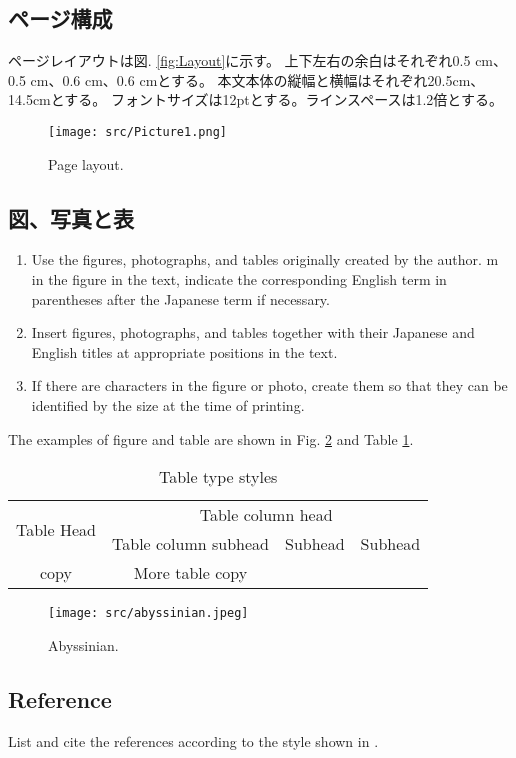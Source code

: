 \subsection{ページ構成}
ページレイアウトは図. \ref{fig:Layout}に示す。
上下左右の余白はそれぞれ0.5 cm、0.5 cm、0.6 cm、0.6 cmとする。
本文本体の縦幅と横幅はそれぞれ20.5cm、14.5cmとする。
フォントサイズは12ptとする。ラインスペースは1.2倍とする。

\begin{figure}[t]
    \centering
    \texttt{[image: src/Picture1.png]}
    \caption{Page layout.}
    \label{fig:layout}
\end{figure}

\subsection{図、写真と表}

\begin{enumerate}
    \item Use the figures, photographs, and tables originally created by the author. m in the figure in the text, indicate the corresponding English term in parentheses after the Japanese term if necessary.
    \item Insert figures, photographs, and tables together with their Japanese and English titles at appropriate positions in the text.
    \item If there are characters in the figure or photo, create them so that they can be identified by the size at the time of printing.
\end{enumerate}

The examples of figure and table are shown in Fig. \ref{fig:abyssinian} and Table \ref{tab:table}.

\begin{table}[t]
    \centering
    \caption{Table type styles}
    \begin{tabular}{c|c|c|c} \hline
        \multirow{2}{1cm}{Table Head} & \multicolumn{3}{|c}{Table column head} \\ \cline{2-4}
         & Table column subhead & Subhead & Subhead \\ \hline\hline
        copy & More table copy & & \\ \hline
    \end{tabular}
    \label{tab:table}
\end{table}

\begin{figure}[t]
    \centering
    \texttt{[image: src/abyssinian.jpeg]}
    \caption{Abyssinian.}
    \label{fig:abyssinian}
\end{figure}

\subsection{Reference}
List and cite the references according to the style shown in
\cite{NIPS2012_c399862d}.
